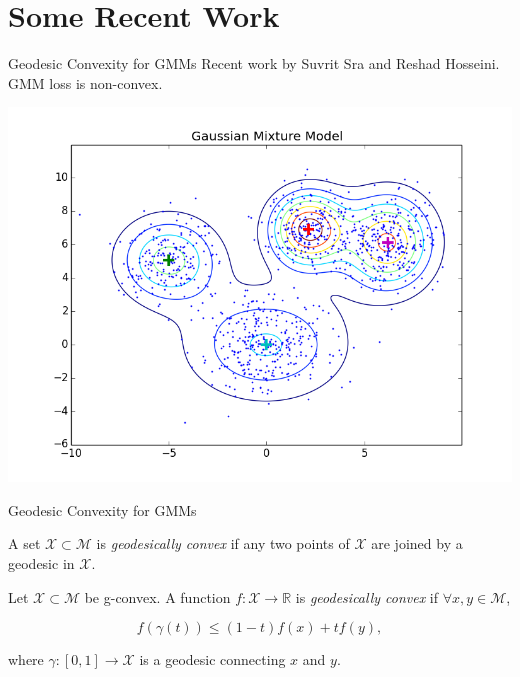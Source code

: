 \documentclass[xcolor=dvipsnames,t]{beamer} %
\newcommand{\reals}{\mathbb{R}}
\begin{document}


\section{Some Recent Work}
\begin{frame}{Geodesic Convexity for GMMs}
   Recent work by Suvrit Sra and Reshad Hosseini.\\

   GMM loss is non-convex.

   \begin{center}
      \includegraphics[width=.8\textwidth]{figures/gmm.png}
   \end{center}
\end{frame}

\begin{frame}{Geodesic Convexity for GMMs}
   \begin{definition}
      A set $\mathcal{X}\subset \mathcal{M}$ is \emph{geodesically convex} if any two points of $\mathcal{X}$ are joined by a geodesic in $\mathcal{X}$.
   \end{definition}
   \begin{definition}
      Let $\mathcal{X}\subset \mathcal{M}$ be g-convex.  A function $f:\mathcal{X}\to\reals$ is \emph{geodesically convex} if $\forall x,y\in\mathcal{M}$,

      \[ f(\gamma(t)) \le (1-t) f(x) + tf(y), \] 

      \noindent where $\gamma:[0,1]\to\mathcal{X}$ is a geodesic connecting $x$ and $y$.
   \end{definition}

\end{frame}
\end{document}
